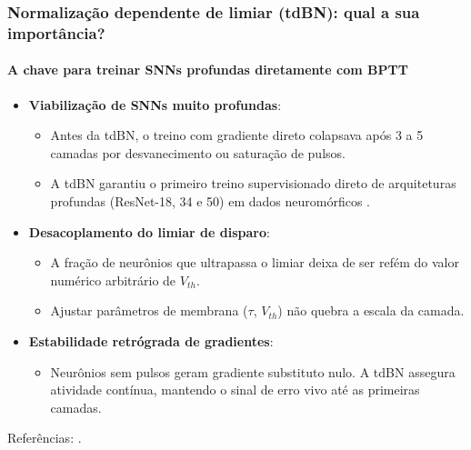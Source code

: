 \begin{frame}
	\frametitle{Normalização dependente de limiar (tdBN): qual a sua importância?}
	\framesubtitle{A chave para treinar SNNs profundas diretamente com BPTT}
	\footnotesize
	\begin{itemize}
		\setlength{\itemsep}{2pt}
		\item \textbf{Viabilização de SNNs muito profundas}:
		\begin{itemize}
			\item Antes da tdBN, o treino com gradiente direto colapsava após 3 a 5 camadas por desvanecimento ou saturação de pulsos.
			\item A tdBN garantiu o primeiro treino supervisionado direto de arquiteturas profundas (ResNet-18, 34 e 50) em dados neuromórficos \cite{zheng2021deeper}.
		\end{itemize}
		\item \textbf{Desacoplamento do limiar de disparo}:
		\begin{itemize}
			\item A fração de neurônios que ultrapassa o limiar deixa de ser refém do valor numérico arbitrário de $V_{th}$.
			\item Ajustar parâmetros de membrana ($\tau$, $V_{th}$) não quebra a escala da camada.
		\end{itemize}
		\item \textbf{Estabilidade retrógrada de gradientes}:
		\begin{itemize}
			\item Neurônios sem pulsos geram gradiente substituto nulo. A tdBN assegura atividade contínua, mantendo o sinal de erro vivo até as primeiras camadas.
		\end{itemize}
	\end{itemize}
	\par\vfill{\tiny Referências: \cite{zheng2021deeper, eshraghian2023training}.}
\end{frame}
